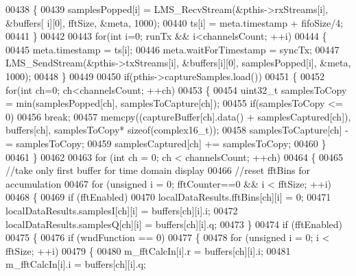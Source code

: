 \begin{DoxyCode}
{{{00438             \{
00439                 samplesPopped[i] = LMS_RecvStream(&pthis->rxStreams[i], &buffers[
      i][0], fftSize, &meta, 1000);
00440                 ts[i] = meta.timestamp + fifoSize/4;
00441             \}
00442 
00443             \textcolor{keywordflow}{for}(\textcolor{keywordtype}{int} i=0; runTx && i<channelsCount; ++i)
00444             \{
00445                 meta.timestamp = ts[i];
00446                 meta.waitForTimestamp = syncTx;
00447                 LMS_SendStream(&pthis->txStreams[i], &buffers[i][0], samplesPopped[i], &meta, 1000);
00448             \}
00449 
00450             \textcolor{keywordflow}{if}(pthis->captureSamples.load())
00451             \{
00452                 \textcolor{keywordflow}{for}(\textcolor{keywordtype}{int} ch=0; ch<channelsCount; ++ch)
00453                 \{
00454                     uint32\_t samplesToCopy = min(samplesPopped[ch], samplesToCapture[ch]);
00455                     \textcolor{keywordflow}{if}(samplesToCopy <= 0)
00456                         \textcolor{keywordflow}{break};
00457                     memcpy((captureBuffer[ch].data() + samplesCaptured[ch]), buffers[ch], samplesToCopy*\textcolor{keyword}{
      sizeof}(complex16_t));
00458                     samplesToCapture[ch] -= samplesToCopy;
00459                     samplesCaptured[ch] += samplesToCopy;
00460                 \}
00461             \}
00462 
00463             \textcolor{keywordflow}{for} (\textcolor{keywordtype}{int} ch = 0; ch < channelsCount; ++ch)
00464             \{
00465                 \textcolor{comment}{//take only first buffer for time domain display}
00466                 \textcolor{comment}{//reset fftBins for accumulation}
00467                 \textcolor{keywordflow}{for} (\textcolor{keywordtype}{unsigned} i = 0; fftCounter==0 && i < fftSize; ++i)
00468                 \{
00469                     \textcolor{keywordflow}{if} (fftEnabled)
00470                         localDataResults.fftBins[ch][i] = 0;
00471                     localDataResults.samplesI[ch][i] = buffers[ch][i].i;
00472                     localDataResults.samplesQ[ch][i] = buffers[ch][i].q;
00473                 \}
00474                 \textcolor{keywordflow}{if} (fftEnabled)
00475                 \{
00476                     \textcolor{keywordflow}{if} (wndFunction == 0)
00477                     \{
00478                         \textcolor{keywordflow}{for} (\textcolor{keywordtype}{unsigned} i = 0; i < fftSize; ++i)
00479                         \{
00480                             m\_fftCalcIn[i].r = buffers[ch][i].i;
00481                             m\_fftCalcIn[i].i = buffers[ch][i].q;
}}}
\end{DoxyCode}
